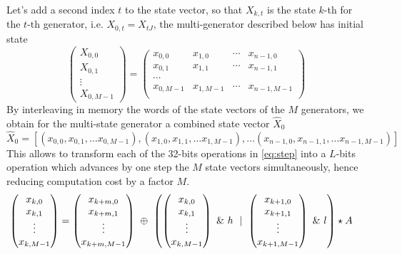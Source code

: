 \documentclass[preprint,1p,times]{elsarticle}
\begin{document}
\noindent Let's add a second index $t$ to the state vector, so that $X_{k,t}$ is the state $k$-th for the $t$-th generator, i.e. $X_{0,t}=X_{tJ}$, the multi-generator described below has initial state
$$
\begin{pmatrix}
    X_{0,0} \\ X_{0,1} \\ \vdots \\ X_{0,M-1}
\end{pmatrix}
= 
\begin{pmatrix}
    x_{0,0} & x_{1,0} & \cdots & x_{n-1,0} \\
    x_{0,1} & x_{1,1} & \cdots & x_{n-1,1} \\
    \cdots \\
    x_{0,M-1} & x_{1,M-1} & \cdots & x_{n-1,M-1} \\
\end{pmatrix}
$$
By interleaving in memory the words of the state vectors of the $M$ generators, we obtain for the multi-state generator a combined state vector $\hat{X}_0$
$$
    \hat{X}_0 = [(x_{0,0}, x_{0,1}, \dots x_{0,M-1}), (x_{1,0}, x_{1,1}, \dots x_{1,M-1}), \dots (x_{n-1,0}, x_{n-1,1}, \dots x_{n-1,M-1})]
$$
This allows to transform each of the 32-bits operations in \eqref{eq:step} into a $L$-bits operation which advances by one step the $M$ state vectors simultaneously, hence reducing computation cost by a factor $M$.
\begin{align}
\label{eq:msmt19937}
\begin{pmatrix}x_{k,0} \\ x_{k,1} \\ \vdots \\ x_{k,M-1} \end{pmatrix}
&= \begin{pmatrix}x_{k+m, 0} \\ x_{k+m,1} \\ \vdots \\ x_{k+m,M-1} \end{pmatrix} ~\mathbin{\oplus}~ \left(\begin{pmatrix}x_{k,0} \\ x_{k,1} \\ \vdots \\ x_{k,M-1} \end{pmatrix}~\&~h ~\mid~ \begin{pmatrix}x_{k+1,0} \\ x_{k+1,1} \\ \vdots \\ x_{k+1,M-1}  \end{pmatrix}~\&~l\right) \star A
\end{align}
\end{document}
